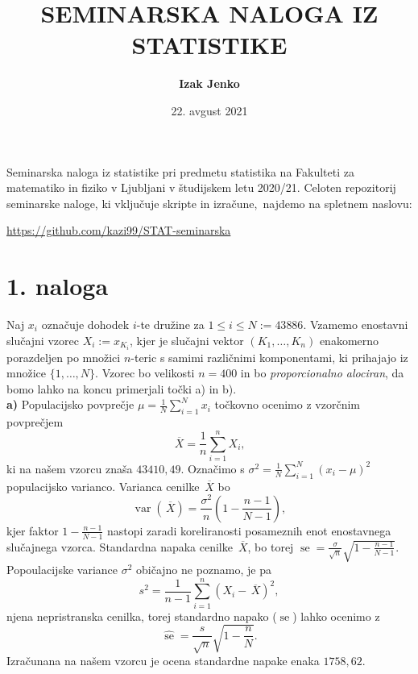 \documentclass[a4paper,11pt]{article}
\newcommand{\olsi}[1]{\,\overline{\!{#1}}} %
\newcommand{\sumin}{\sum_{i = 1}^n}
\renewcommand{\var}[1]{\operatorname{var}(#1)}
\DeclareMathOperator{\se}{se}
\begin{document}
    
\author{\textbf{Izak Jenko}}
\title{SEMINARSKA NALOGA IZ STATISTIKE}
\date{22. avgust 2021}

\maketitle
\thispagestyle{empty}

\par
Seminarska naloga iz statistike pri predmetu statistika na Fakulteti za matematiko in fiziko v Ljubljani v študijskem letu 2020/21. Celoten repozitorij seminarske naloge, ki vključuje skripte in izračune, najdemo na spletnem naslovu:
\begin{center}
    \url{https://github.com/kazi99/STAT-seminarska} 
\end{center}

\section*{1. naloga}

Naj $x_i$ označuje dohodek $i$-te družine za $1 \leq i \leq N := 43 886$. Vzamemo enostavni slučajni vzorec $X_i := x_{K_i}$, kjer je slučajni vektor $(K_1, \ldots, K_n)$ enakomerno porazdeljen po množici $n$-teric s samimi različnimi komponentami, ki prihajajo iz množice $\{ 1, \dots, N\}$. Vzorec bo velikosti $n = 400$ in bo \emph{proporcionalno alociran}, da bomo lahko na koncu primerjali točki a) in b).
\\

\noindent
\textbf{a)} Populacijsko povprečje $\mu = \frac1N \sum_{i=1}^N x_i$ točkovno ocenimo z vzorčnim povprečjem
\[
    \olsi{X} = \frac1n \sum_{i = 1}^n X_i,  
\]
ki na našem vzorcu znaša $43410,49$. Označimo s $\sigma^2 = \frac{1}{N}\sum_{i = 1}^N (x_i - \mu)^2$ populacijsko varianco. Varianca cenilke $\olsi{X}$ bo 
\[
    \var{\olsi{X}} = \frac{\sigma^2}{n}\left(1 - \frac{n-1}{N-1}\right),
\]
kjer faktor $1 - \frac{n-1}{N-1}$ nastopi zaradi koreliranosti posameznih enot enostavnega slučajnega vzorca. Standardna napaka cenilke $\olsi{X}$, bo torej $\se = \frac{\sigma}{\sqrt{n}} \sqrt{1 - \frac{n-1}{N-1}}$. Popoulacijske variance $\sigma^2$ običajno ne poznamo, je pa 
\[
    s^2 = \frac{1}{n-1}\sumin(X_i - \olsi{X})^2, 
\]
njena nepristranska cenilka, torej standardno napako ($\se$) lahko ocenimo z
\[
    \hat{\se} = \frac{s}{\sqrt{n}}\sqrt{1 - \frac{n}{N}}.
\]
Izračunana na našem vzorcu je ocena standardne napake enaka $1758,62$.
\end{document}
